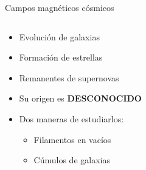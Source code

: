 \documentclass[xetex,aspectratio=169]{beamer}
\begin{document}
	\begin{frame}{Campos magnéticos cósmicos}
		\begin{columns}
			
			\begin{column}{0.48\textwidth}
				\begin{itemize}
					\item Evolución de galaxias
					\item Formación de estrellas
					\item Remanentes de supernovas
					\item Su origen es \alert{\textbf{DESCONOCIDO}}
				\end{itemize}
				\begin{itemize}
					\item Dos maneras de estudiarlos:
					\begin{itemize}
						\item Filamentos en vacíos
						\item Cúmulos de galaxias
					\end{itemize}
				\end{itemize}
			\end{column}
			
			\begin{column}{0.48\textwidth}
				
				
			\end{column}
		\end{columns}
	\end{frame}
\end{document}
